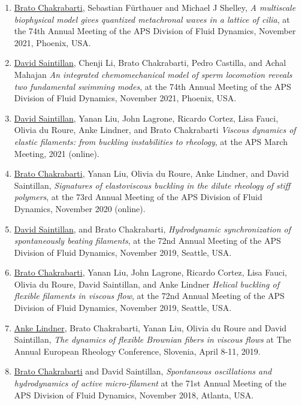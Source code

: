 \documentclass[10pt]{res} %
\begin{document}
\begin{resume}
\begin{enumerate}
\item  \underline{Brato Chakrabarti}, Sebastian F\"{u}rthauer and Michael J Shelley, \textit{A multiscale biophysical model gives quantized metachronal waves in a lattice of cilia}, at the 74th Annual Meeting of the APS Division of Fluid Dynamics, November 2021, Phoenix, USA.

\item \underline{David Saintillan}, Chenji Li, Brato Chakrabarti, Pedro Castilla, and Achal Mahajan \textit{An integrated chemomechanical model of sperm locomotion reveals two fundamental swimming modes}, at the 74th Annual Meeting of the APS Division of Fluid Dynamics, November 2021, Phoenix, USA.

\item \underline{David Saintillan}, Yanan Liu, John Lagrone, Ricardo Cortez, Lisa Fauci, Olivia du Roure, Anke Lindner, and Brato Chakrabarti \textit{Viscous dynamics of elastic filaments: from buckling instabilities to rheology},  at the APS March Meeting,  2021 (online).


\item \underline{Brato Chakrabarti}, Yanan Liu, Olivia du Roure, Anke Lindner, and David Saintillan, \textit{Signatures of elastoviscous buckling in the dilute rheology of stiff polymers}, at the 73rd Annual Meeting of the APS Division of Fluid Dynamics, November 2020 (online).

\item \underline{David Saintillan}, and Brato Chakrabarti, \textit{Hydrodynamic synchronization of spontaneously beating filaments}, at the 72nd Annual Meeting of the APS Division of Fluid Dynamics, November 2019, Seattle, USA.

\item \underline{Brato Chakrabarti}, Yanan Liu, John Lagrone, Ricardo Cortez, Lisa Fauci, Olivia du Roure, David Saintillan, and Anke Lindner \textit{Helical buckling of flexible filaments in viscous flow},  at the 72nd Annual Meeting of the APS Division of Fluid Dynamics, November 2019, Seattle, USA.

\item \underline{Anke Lindner}, Brato Chakrabarti, Yanan Liu, Olivia du Roure and David Saintillan, \textit{The dynamics of flexible Brownian fibers in viscous flows} at  The Annual European Rheology Conference, Slovenia, April 8-11, 2019.

\item \underline{Brato Chakrabarti} and David Saintillan, \textit{Spontaneous oscillations and hydrodynamics of active micro-filament} at the 71st Annual Meeting of the APS Division of Fluid Dynamics, November 2018, Atlanta, USA. 


\end{enumerate}
\end{resume}
\end{document}
